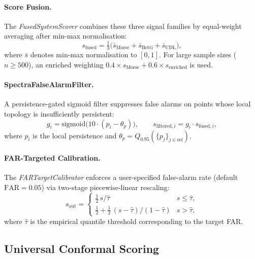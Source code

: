 \documentclass[final]{siamltex}
\begin{document}
\paragraph{Score Fusion.}
The \emph{FusedSystemScorer} combines these three signal families
by equal-weight averaging after min-max normalisation:
\begin{equation}\label{eq:fusion}
  s_{\mathrm{fused}} = \tfrac{1}{3}\bigl(
  \bar{s}_{\mathrm{Morse}} + \bar{s}_{\mathrm{Betti}}
  + \bar{s}_{\mathrm{UDL}}\bigr),
\end{equation}
where $\bar{s}$ denotes min-max normalisation to $[0,1]$.
For large sample sizes ($n \ge 500$), an enriched weighting
$0.4 \times s_{\mathrm{Morse}} + 0.6 \times s_{\mathrm{enriched}}$
is used.

\paragraph{SpectraFalseAlarmFilter.}
A persistence-gated sigmoid filter suppresses false alarms on
points whose local topology is insufficiently persistent:
\begin{equation}\label{eq:spectra_gate}
  g_i = \mathrm{sigmoid}\bigl(10\cdot(p_i - \theta_p)\bigr),
  \qquad s_{\mathrm{filtered},i} = g_i\cdot s_{\mathrm{fused},i},
\end{equation}
where $p_i$ is the local persistence and
$\theta_p = Q_{0.95}(\{p_j\}_{j \in \mathrm{ref}})$.

\paragraph{FAR-Targeted Calibration.}
The \emph{FARTargetCalibrator} enforces a user-specified
false-alarm rate (default $\mathrm{FAR} = 0.05$) via
two-stage piecewise-linear rescaling:
\begin{equation}\label{eq:far_cal}
  s_{\mathrm{out}} = \begin{cases}
  \tfrac{1}{2}\,s / \hat{\tau} & s \le \hat{\tau},\\
  \tfrac{1}{2} + \tfrac{1}{2}\,(s - \hat{\tau})/(1 - \hat{\tau})
  & s > \hat{\tau},
  \end{cases}
\end{equation}
where $\hat{\tau}$ is the empirical quantile threshold
corresponding to the target FAR.


\subsection{Universal Conformal Scoring}\label{sec:conformal}
\end{document}
